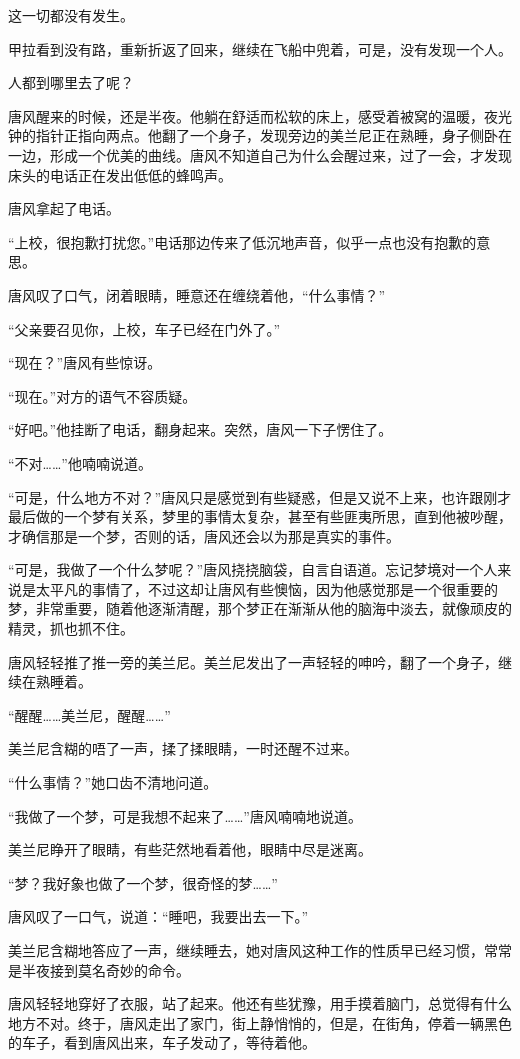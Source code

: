 这一切都没有发生。 

甲拉看到没有路，重新折返了回来，继续在飞船中兜着，可是，没有发现一个人。 

人都到哪里去了呢？ 

唐风醒来的时候，还是半夜。他躺在舒适而松软的床上，感受着被窝的温暖，夜光钟的指针正指向两点。他翻了一个身子，发现旁边的美兰尼正在熟睡，身子侧卧在一边，形成一个优美的曲线。唐风不知道自己为什么会醒过来，过了一会，才发现床头的电话正在发出低低的蜂鸣声。 

唐风拿起了电话。 

“上校，很抱歉打扰您。”电话那边传来了低沉地声音，似乎一点也没有抱歉的意思。 

唐风叹了口气，闭着眼睛，睡意还在缠绕着他，“什么事情？” 

“父亲要召见你，上校，车子已经在门外了。” 

“现在？”唐风有些惊讶。 

“现在。”对方的语气不容质疑。 

“好吧。”他挂断了电话，翻身起来。突然，唐风一下子愣住了。 

“不对……”他喃喃说道。 

“可是，什么地方不对？”唐风只是感觉到有些疑惑，但是又说不上来，也许跟刚才最后做的一个梦有关系，梦里的事情太复杂，甚至有些匪夷所思，直到他被吵醒，才确信那是一个梦，否则的话，唐风还会以为那是真实的事件。 

“可是，我做了一个什么梦呢？”唐风挠挠脑袋，自言自语道。忘记梦境对一个人来说是太平凡的事情了，不过这却让唐风有些懊恼，因为他感觉那是一个很重要的梦，非常重要，随着他逐渐清醒，那个梦正在渐渐从他的脑海中淡去，就像顽皮的精灵，抓也抓不住。 

唐风轻轻推了推一旁的美兰尼。美兰尼发出了一声轻轻的呻吟，翻了一个身子，继续在熟睡着。 

“醒醒……美兰尼，醒醒……” 

美兰尼含糊的唔了一声，揉了揉眼睛，一时还醒不过来。 

“什么事情？”她口齿不清地问道。 

“我做了一个梦，可是我想不起来了……”唐风喃喃地说道。 

美兰尼睁开了眼睛，有些茫然地看着他，眼睛中尽是迷离。 

“梦？我好象也做了一个梦，很奇怪的梦……” 

唐风叹了一口气，说道：“睡吧，我要出去一下。” 

美兰尼含糊地答应了一声，继续睡去，她对唐风这种工作的性质早已经习惯，常常是半夜接到莫名奇妙的命令。 

唐风轻轻地穿好了衣服，站了起来。他还有些犹豫，用手摸着脑门，总觉得有什么地方不对。终于，唐风走出了家门，街上静悄悄的，但是，在街角，停着一辆黑色的车子，看到唐风出来，车子发动了，等待着他。 

